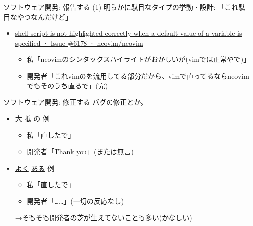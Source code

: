 \documentclass[
        unicode%
    ]{beamer}
\begin{document}
\begin{frame}{ソフトウェア開発: 報告する (1)}
    明らかに駄目なタイプの挙動・設計: 「これ駄目なやつなんだけど」

    \begin{itemize}
        \item \href{https://github.com/neovim/neovim/issues/6178}{shell script is not highlighted correctly when a default value of a variable is specified · Issue \#6178 · neovim/neovim}
            \begin{itemize}
                \item 私「neovimのシンタックスハイライトがおかしいが(vimでは正常やで)」
                \pause
                \item 開発者「これvimのを流用してる部分だから、vimで直ってるならneovimでもそのうち直るで」(完)
            \end{itemize}
    \end{itemize}
\end{frame}

\begin{frame}{ソフトウェア開発: 修正する}
    バグの修正とか。

    \begin{itemize}
        \item
            \href{https://github.com/dylanede/rusttype/pull/14}{大}%
            \href{https://github.com/dylanede/rusttype/pull/15}{抵}%
            \href{https://git.gnu.io/gnu/gnu-social/merge_requests/145}{の}%
            \href{https://git.gnu.io/h2p/Qvitter/merge_requests/101}{例}

            \begin{itemize}
                \item 私「直したで」
                \item 開発者「Thank you」(または無言)
            \end{itemize}
        \item
            \href{https://github.com/reem/rust-ordered-float/pull/28}{よく}%
            \href{https://gitgud.io/panjoozek413/qvitterplus/merge_requests/3}{ある}%
            例
            \begin{itemize}
                \item 私「直したで」
                \item 開発者「……」(一切の反応なし)
            \end{itemize}
            \pause
            →そもそも開発者の芝が生えてないことも多い(かなしい)
    \end{itemize}
\end{frame}
\end{document}
